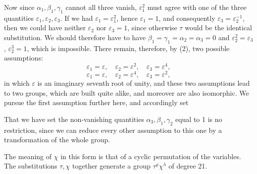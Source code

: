 Now since $\alpha_1, \beta_1, \gamma_1$ cannot all three vanish, $\varepsilon_1^2$
must agree with one of the three quantities $\varepsilon_1, \varepsilon_2, \varepsilon_3$.
If we had $\varepsilon_1 = \varepsilon_1^2$, hence $\varepsilon_1 = 1$, and consequently $\varepsilon_3 = \varepsilon_2^{-1}$, then
we could have neither $\varepsilon_2$ nor $\varepsilon_3 = 1$, since otherwise $\tau$ would be the identical
substitution. We should therefore have to have $\beta_1 = \gamma_1 = \alpha_2 = \alpha_3 = 0$ and $\varepsilon_2^2 = \varepsilon_3$,
$\varepsilon_2^3 = 1$, which is impossible. There remain, therefore, by (2),
two possible assumptions:
\[
\varepsilon_1 = \varepsilon, \quad \varepsilon_2 = \varepsilon^2, \quad \varepsilon_3 = \varepsilon^4,
\]
\[
\varepsilon_1 = \varepsilon, \quad \varepsilon_2 = \varepsilon^4, \quad \varepsilon_3 = \varepsilon^2,
\]
in which $\varepsilon$ is an imaginary seventh root of unity, and these
two assumptions lead to two  groups, which are
built quite alike, and moreover are also isomorphic. We pursue the first assumption further here, and accordingly set

That we have set the non-vanishing quantities $\alpha_3, \beta_1, \gamma_2$ equal to 1
is no restriction, since we can reduce every other assumption to this one by a transformation of the whole
group.

The meaning of $\chi$ in this form is that of a cyclic
permutation of the variables. The substitutions $\tau, \chi$ together
generate a group $\tau^\varrho \chi^\lambda$ of degree 21.
